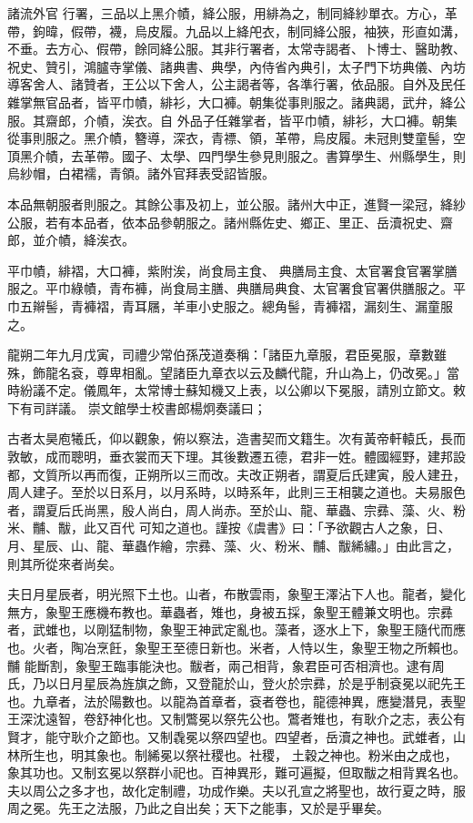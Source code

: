 \begin{pinyinscope}
 諸流外官
 行署，三品以上黑介幘，絳公服，用緋為之，制同絳紗單衣。方心，革帶，鉤暐，假帶，襪，烏皮履。九品以上絳戺衣，制同絳公服，袖狹，形直如溝，不垂。去方心、假帶，餘同絳公服。其非行署者，太常寺謁者、卜博士、醫助教、祝史、贊引，鴻臚寺掌儀、諸典書、典學，內侍省內典引，太子門下坊典儀、內坊導客舍人、諸贊者，王公以下舍人，公主謁者等，各準行署，依品服。自外及民任雜掌無官品者，皆平巾幘，緋衫，大口褲。朝集從事則服之。諸典謁，武弁，絳公服。其齋郎，介幘，涘衣。自
 外品子任雜掌者，皆平巾幘，緋衫，大口褲。朝集從事則服之。黑介幘，簪導，深衣，青褾、領，革帶，烏皮履。未冠則雙童髻，空頂黑介幘，去革帶。國子、太學、四門學生參見則服之。書算學生、州縣學生，則烏紗帽，白裙襦，青領。諸外官拜表受詔皆服。



 本品無朝服者則服之。其餘公事及初上，並公服。諸州大中正，進賢一梁冠，絳紗公服，若有本品者，依本品參朝服之。諸州縣佐史、鄉正、里正、岳瀆祝史、齋郎，並介幘，絳涘衣。



 平巾幘，緋褶，大口褲，紫附涘，尚食局主食、
 典膳局主食、太官署食官署掌膳服之。平巾綠幘，青布褲，尚食局主膳、典膳局典食、太官署食官署供膳服之。平巾五辮髻，青褲褶，青耳屩，羊車小史服之。總角髻，青褲褶，漏刻生、漏童服之。



 龍朔二年九月戊寅，司禮少常伯孫茂道奏稱：「諸臣九章服，君臣冕服，章數雖殊，飾龍名袞，尊卑相亂。望諸臣九章衣以云及麟代龍，升山為上，仍改冕。」當時紛議不定。儀鳳年，太常博士蘇知機又上表，以公卿以下冕服，請別立節文。敕下有司詳議。
 崇文館學士校書郎楊炯奏議曰；



 古者太昊庖犧氏，仰以觀象，俯以察法，造書契而文籍生。次有黃帝軒轅氏，長而敦敏，成而聰明，垂衣裳而天下理。其後數遷五德，君非一姓。體國經野，建邦設都，文質所以再而復，正朔所以三而改。夫改正朔者，謂夏后氏建寅，殷人建丑，周人建子。至於以日系月，以月系時，以時系年，此則三王相襲之道也。夫易服色者，謂夏后氏尚黑，殷人尚白，周人尚赤。至於山、龍、華蟲、宗彞、藻、火、粉米、黼、黻，此又百代
 可知之道也。謹按《虞書》曰：「予欲觀古人之象，日、月、星辰、山、龍、華蟲作繪，宗彞、藻、火、粉米、黼、黻絺繡。」由此言之，則其所從來者尚矣。



 夫日月星辰者，明光照下土也。山者，布散雲雨，象聖王澤沾下人也。龍者，變化無方，象聖王應機布教也。華蟲者，雉也，身被五採，象聖王體兼文明也。宗彞者，武蜼也，以剛猛制物，象聖王神武定亂也。藻者，逐水上下，象聖王隨代而應也。火者，陶冶烹飪，象聖王至德日新也。米者，人恃以生，象聖王物之所賴也。黼
 能斷割，象聖王臨事能決也。黻者，兩己相背，象君臣可否相濟也。逮有周氏，乃以日月星辰為旌旗之飾，又登龍於山，登火於宗彞，於是乎制袞冕以祀先王也。九章者，法於陽數也。以龍為首章者，袞者卷也，龍德神異，應變潛見，表聖王深沈遠智，卷舒神化也。又制鷩冕以祭先公也。鷩者雉也，有耿介之志，表公有賢才，能守耿介之節也。又制毳冕以祭四望也。四望者，岳瀆之神也。武蜼者，山林所生也，明其象也。制絺冕以祭社稷也。社稷，
 土穀之神也。粉米由之成也，象其功也。又制玄冕以祭群小祀也。百神異形，難可遍擬，但取黻之相背異名也。夫以周公之多才也，故化定制禮，功成作樂。夫以孔宣之將聖也，故行夏之時，服周之冕。先王之法服，乃此之自出矣；天下之能事，又於是乎畢矣。




\end{pinyinscope}
